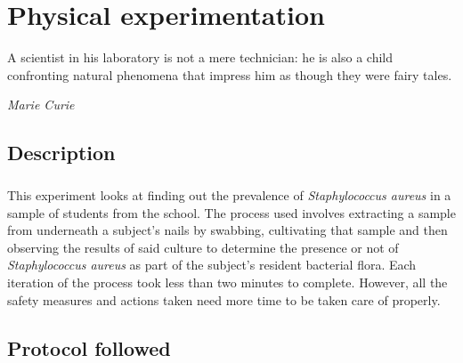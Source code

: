 \chapter{Physical experimentation}
\epigraph{A scientist in his laboratory is not a mere technician: he is also a child confronting natural phenomena that impress him as though they were fairy tales.}{\textit{Marie Curie}}
\section{Description}
\paragraph{}This experiment looks at finding out the prevalence of \emph{Staphylococcus aureus} in a sample of students from the school. The process used involves extracting a sample from underneath a subject's nails by swabbing, cultivating that sample and then observing the results of said culture to determine the presence or not of \emph{Staphylococcus aureus} as part of the subject's resident bacterial flora. Each iteration of the process took less than two minutes to complete. However, all the safety measures and actions taken need more time to be taken care of properly.
\section{Protocol followed}
